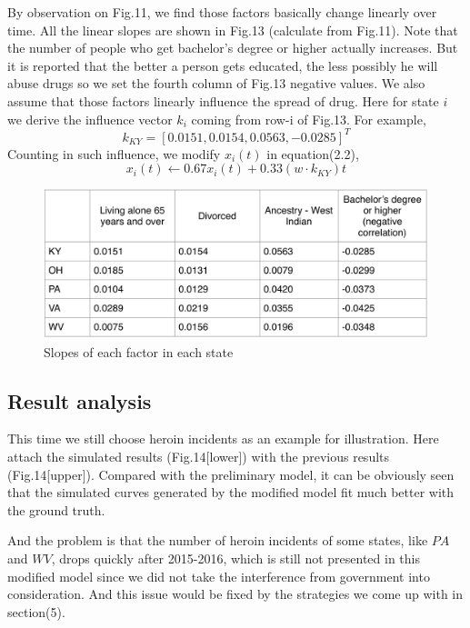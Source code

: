 \documentclass[12pt]{article}
\begin{document}
By observation on Fig.11, we find those factors basically change linearly over time.  All the linear slopes are shown in Fig.13 (calculate from Fig.11). Note that the number of people who get bachelor's degree or higher actually increases. But it is reported that the better a person gets educated, the less possibly he will abuse drugs so we set the fourth column of Fig.13 negative values. We also assume that those factors linearly influence the spread of drug. Here for state $i$ we derive the influence vector $k_i$ coming from row-i of Fig.13. For example, 
$$
k_{KY} = [0.0151, 0.0154, 0.0563, -0.0285]^T
$$
Counting in such influence, we modify $x_i(t)$ in equation(2.2),
$$
x_i(t) \leftarrow 0.67x_i(t) + 0.33 (w\cdot k_{KY})t
$$
\begin{figure}[!htbp]
\small
\centering
\includegraphics[width=16cm]{Fig/k_states}
\caption{Slopes of each factor in each state}
\end{figure}

\subsection{Result analysis}
This time we still choose heroin incidents as an example for illustration. Here attach the simulated results (Fig.14[lower]) with the previous results (Fig.14[upper]). Compared with the preliminary model, it can be obviously seen that the simulated curves generated by the modified model fit much better with the ground truth.

And the problem is that the number of heroin incidents of some states, like $PA$ and $WV$, drops quickly after 2015-2016, which is still not presented in this modified model since we did not take the interference from government into consideration. And this issue would be fixed by the strategies we come up with in section(5).
\end{document}
